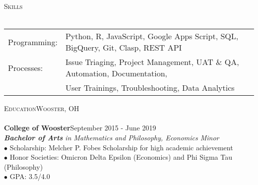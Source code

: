 \documentclass[a4paper]{article}
\newcommand{\lineunder} {
    \vspace*{-8pt} \\
    \hspace*{-18pt} \hrulefill \\
}
\newcommand{\header} [1] {
    {\hspace*{-18pt}\vspace*{6pt} \textsc{#1}}
    \vspace*{-6pt} \lineunder
}
\begin{document}
\header{Skills}
\begin{tabular}{ l l }
	Programming:    &   Python, R, JavaScript, Google Apps Script, SQL, BigQuery, Git, Clasp, REST API\\
    Processes:      &   Issue Triaging, Project Management, UAT \& QA, Automation, Documentation,\\ 
                    &   User Trainings, Troubleshooting,  Data Analytics
\end{tabular}
\vspace{2mm}

\header{Education\hfill Wooster, OH}
\textbf{College of Wooster}\hfill September 2015 - June 2019\\
\textit{\textbf{Bachelor of Arts} in Mathematics and Philosophy, Economics Minor}\\
    $\bullet$ Scholarship: Melcher P. Fobes Scholarship for high academic achievement\\
    $\bullet$ Honor Societies: Omicron Delta Epsilon (Economics) and Phi Sigma Tau (Philosophy)\\
    $\bullet$ GPA: 3.5/4.0

\vspace*{2mm}
\end{document}
